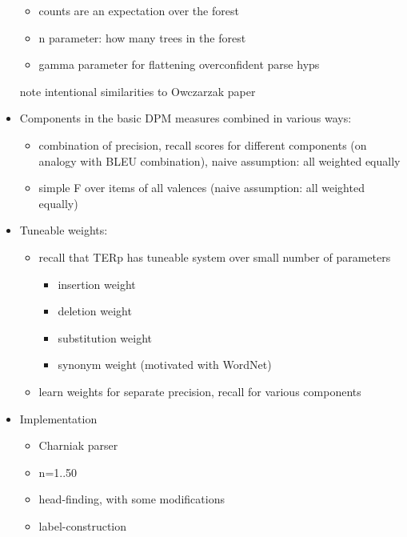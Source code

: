 \documentclass{kluwer}    %
\begin{document}
\begin{article}
\begin{itemize}
  \begin{itemize}
  \item  counts are an expectation over the forest
  \item n parameter: how many trees in the forest
  \item gamma parameter for flattening overconfident parse hyps
  \end{itemize}
  note intentional similarities to Owczarzak paper


\item Components in the basic DPM measures combined in various ways:

  \begin{itemize}
  \item combination of precision, recall scores for different
    components (on analogy with BLEU combination), naive assumption:
    all weighted equally

  \item simple F over items of all valences (naive assumption: all
    weighted equally)
  \end{itemize}
\item Tuneable weights:
  \begin{itemize}
  \item recall that TERp has tuneable system over small number of parameters
    \begin{itemize}
    \item insertion weight
    \item deletion weight
    \item substitution weight
    \item synonym weight (motivated with WordNet)
    \end{itemize}
  \item learn weights for separate precision, recall for various
    components
  \end{itemize}
  
\item Implementation
  \begin{itemize}
  \item Charniak parser
  \item n=1..50
  \item head-finding, with some modifications
  \item label-construction
  \end{itemize}


\end{itemize}
\end{article}
\end{document}

